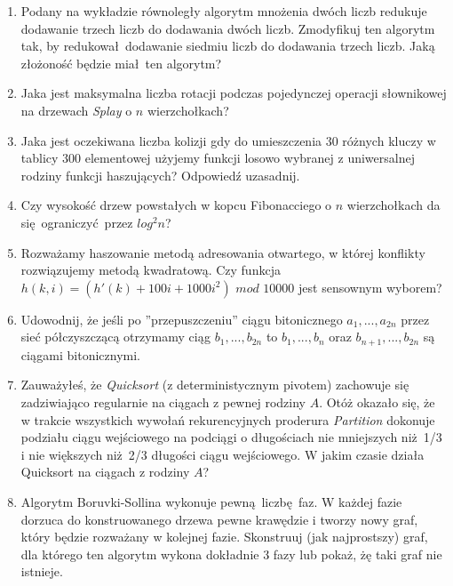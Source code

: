 \documentclass[12pt]{article}
\begin{document}
\begin{enumerate}
    \item{Podany na wykładzie równoległy algorytm mnożenia dwóch liczb redukuje
    dodawanie trzech liczb do dodawania dwóch liczb. Zmodyfikuj ten algorytm 
    tak, by redukował dodawanie siedmiu liczb do dodawania trzech liczb. Jaką
    złożoność będzie miał ten algorytm?}

    \item{Jaka jest maksymalna liczba rotacji podczas pojedynczej operacji
    słownikowej na drzewach \textit{Splay} o $n$ wierzchołkach?}

    \item{Jaka jest oczekiwana liczba kolizji gdy do umieszczenia 30 różnych
    kluczy w tablicy 300 elementowej użyjemy funkcji losowo wybranej z
    uniwersalnej rodziny funkcji haszujących? Odpowiedź uzasadnij.}

    \item{Czy wysokość drzew powstałych w kopcu Fibonacciego o $n$ wierzchołkach
    da się ograniczyć przez $log^2n$?}

    \item{Rozważamy haszowanie metodą adresowania otwartego, w której konflikty
    rozwiązujemy metodą kwadratową. Czy funkcja $h(k,i)=(h'(k)+100i+1000i^2)\,\,mod\,\, 10000$}
    jest sensownym wyborem?

    \item{Udowodnij, że jeśli po ''przepuszczeniu'' ciągu bitonicznego $a_1,...,a_{2n}$
    przez sieć półczyszczącą otrzymamy ciąg $b_1,...,b_{2n}$ to $b_1,...,b_{n}$
    oraz $b_{n+1},...,b_{2n}$ są ciągami bitonicznymi.}
    
    \item{Zauważyłeś, że \textit{Quicksort} (z deterministycznym pivotem) zachowuje
    się zadziwiająco regularnie na ciągach z pewnej rodziny $A$. Otóż okazało
    się, że w trakcie wszystkich wywołań rekurencyjnych proderura \textit{Partition}
    dokonuje podziału ciągu wejściowego na podciągi o długościach nie mniejszych
    niż 1/3 i nie większych niż 2/3 długości ciągu wejściowego. W jakim
    czasie działa Quicksort na ciągach z rodziny $A$?}

    \item{Algorytm Boruvki-Sollina wykonuje pewną liczbę faz. W każdej fazie
    dorzuca do konstruowanego drzewa pewne krawędzie i tworzy nowy graf, który będzie rozważany
    w kolejnej fazie. Skonstruuj (jak najprostszy) graf, dla którego ten algorytm
    wykona dokładnie 3 fazy lub pokaż, żę taki graf nie istnieje.}


\end{enumerate}
\end{document}
